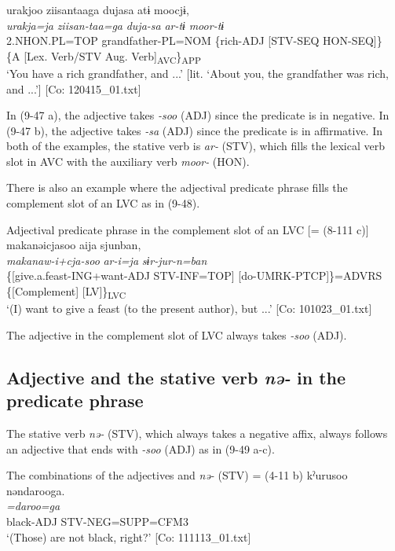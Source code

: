 \ex \label{ex:9.47b} %
    \gllll  urakjoo  ziisantaaga  dujasa  atɨ   moocjɨ,\\
      \textit{urakja=ja}  \textit{ziisan-taa=ga}  \textit{duja-sa}  \textit{ar-tɨ}  \textit{moor-tɨ}\\
      2.NHON.PL=TOP  grandfather-PL=NOM  \{rich-ADJ  [STV-SEQ  HON-SEQ]\}\\
          \{A  [Lex. Verb/STV   Aug. Verb]\textsubscript{AVC}\}\textsubscript{APP}\\
      \glt       ‘You have a rich grandfather, and ...’ [lit. ‘About you, the grandfather was rich, and ...’] [Co: 120415\_01.txt]
    \z
\z

In (9-47 a), the adjective takes \textit{{}-soo} (ADJ) since the predicate is in negative. In (9-47 b), the adjective takes \textit{{}-sa} (ADJ) since the predicate is in affirmative. In both of the examples, the stative verb is \textit{ar-} (STV), which fills the lexical verb slot in AVC with the auxiliary verb \textit{moor-} (HON).

There is also an example where the adjectival predicate phrase fills the complement slot of an LVC as in (9-48).

\ea   Adjectival predicate phrase in the complement slot of an LVC [= (8-111 c)] \label{ex:9.48}
 \gllll  makanəicjasoo  aija  sjunban,\\
    \textit{makanaw-i+cja-soo}  \textit{ar-i=ja}  \textit{sɨr-jur-n=ban}\\
    \{[give.a.feast-ING+want-ADJ  STV-INF=TOP]  [do-UMRK-PTCP]\}=ADVRS\\
    \{[Complement]    [LV]\}\textsubscript{LVC}\\
    \glt     ‘(I) want to give a feast (to the present author), but ...’ [Co: 101023\_01.txt]
\z

The adjective in the complement slot of LVC always takes \textit{{}-soo} (ADJ).

\subsection{Adjective and the stative verb \textit{nə-} in the predicate phrase}\label{sec:9.2.3}

The stative verb \textit{nə-} (STV), which always takes a negative affix, always follows an adjective that ends with \textit{{}-soo} (ADJ) as in (9-49 a-c).

\ea   The combinations of the adjectives and \textit{nə-} (STV) \label{ex:9.49}
  \ea{} = (4-11 b)
    \glll  kˀurusoo  nəndarooga.\\
      \textit{}  \textit{=daroo=ga}\\
      black-ADJ  STV-NEG=SUPP=CFM3\\
      \glt       ‘(Those) are not black, right?’ [Co: 111113\_01.txt]

